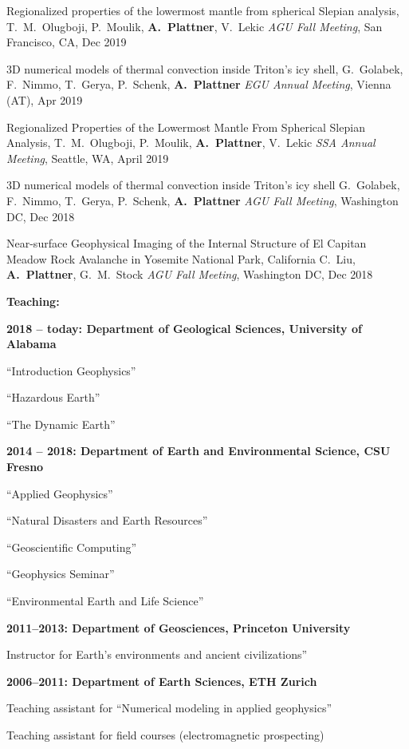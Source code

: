 \documentclass[10pt]{article}
\begin{document}
\spcp
Regionalized properties of the lowermost mantle from spherical Slepian analysis,
T.~M.~Olugboji, P.~Moulik, \textbf{A.~Plattner}, V.~Lekic
\emph{AGU Fall Meeting}, San Francisco, CA, Dec 2019

\spcp
3D numerical models of thermal convection inside Triton’s icy shell, G.~Golabek, F.~Nimmo, T.~Gerya, P.~Schenk, \textbf{A.~Plattner}
\emph{EGU Annual Meeting}, Vienna (AT), Apr 2019

\spcp
Regionalized Properties of the Lowermost Mantle From Spherical Slepian Analysis,
T.~M.~Olugboji, P.~Moulik, \textbf{A.~Plattner}, V.~Lekic
\emph{SSA Annual Meeting}, Seattle, WA, April 2019

\spcp
3D numerical models of thermal convection inside Triton's icy shell
G.~Golabek, F.~Nimmo, T.~Gerya, P.~Schenk, \textbf{A.~Plattner}
\emph{AGU Fall Meeting}, Washington DC, Dec 2018

\spcp
Near-surface Geophysical Imaging of the Internal Structure of El Capitan Meadow Rock Avalanche in Yosemite National Park, California
C.~Liu, \textbf{A.~Plattner}, G.~M.~Stock
\emph{AGU Fall Meeting}, Washington DC, Dec 2018



\spc
\textbf{\tsize Teaching:}

\spcp
\textbf{2018 -- today: Department of Geological Sciences,
University of Alabama}

``Introduction Geophysics''

``Hazardous Earth''

``The Dynamic Earth''


\spcp
\textbf{2014 -- 2018:  Department of Earth and Environmental Science, CSU Fresno}

``Applied Geophysics''

``Natural Disasters and Earth Resources''

``Geoscientific Computing''

``Geophysics Seminar''

``Environmental Earth and Life Science''


\spcp
\textbf{2011--2013:  Department of Geosciences, Princeton University}

Instructor for Earth's environments and ancient civilizations''

\spcp
\textbf{2006--2011: Department of Earth Sciences, ETH Zurich}

Teaching assistant for ``Numerical modeling in applied geophysics''
     
Teaching assistant for field courses (electromagnetic prospecting)
\end{document}
